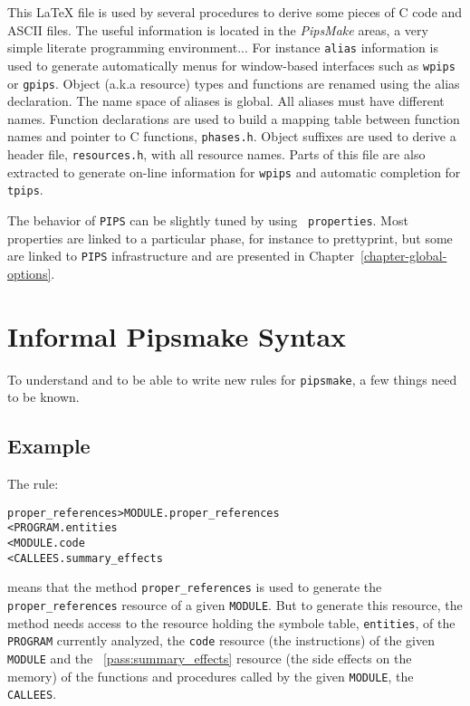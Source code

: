 \documentclass[a4paper]{report}
\newcommand{\PipsPassRef}[1]{\texttt{\detokenize{#1}}~\ref{pass:#1}}
\begin{document}
This \LaTeX{} file is used by several procedures to derive some pieces
of C code and ASCII files. The useful information is located in the
{\em PipsMake} areas, a very simple literate programming
environment... For instance \verb+alias+ information is used to
generate automatically menus for window-based interfaces such as
\verb+wpips+ or \verb+gpips+. Object (a.k.a resource) types and
functions are renamed using the alias declaration. The name space of
aliases is global. All aliases must have different names. Function
declarations are used to build a mapping table between function names
and pointer to C functions, \texttt{phases.h}. Object suffixes are
used to derive a header file, {\tt resources.h}, with all resource
names. Parts of this file are also extracted to generate on-line
information for {\tt wpips} and automatic completion for {\tt tpips}.

The behavior of {\tt PIPS} can be slightly tuned by using {\tt
  properties}. Most properties are linked to a particular phase, for
instance to prettyprint, but some are linked to {\tt PIPS}
infrastructure and are presented in
Chapter~\ref{chapter-global-options}.

\section{Informal Pipsmake Syntax}
\label{sec:informal-syntax}

To understand and to be able to write new rules for {\tt pipsmake}, a
few things need to be known.

\subsection{Example}
\label{sec:example}

The rule:

\begin{alltt}
proper_references       > MODULE.proper_references
        < PROGRAM.entities
        < MODULE.code
        < CALLEES.summary_effects
\end{alltt}
means that the method \verb|proper_references| is used to generate the
\verb|proper_references| resource of a given \texttt{MODULE}. But to
generate this resource, the method needs access to the resource holding
the symbole table, \texttt{entities}, of the \texttt{PROGRAM} currently
analyzed, the \texttt{code} resource (the instructions) of the given
\texttt{MODULE} and the \PipsPassRef{summary_effects} resource (the side effects
on the memory) of the functions and procedures called by the given
\texttt{MODULE}, the \texttt{CALLEES}.
\end{document}

